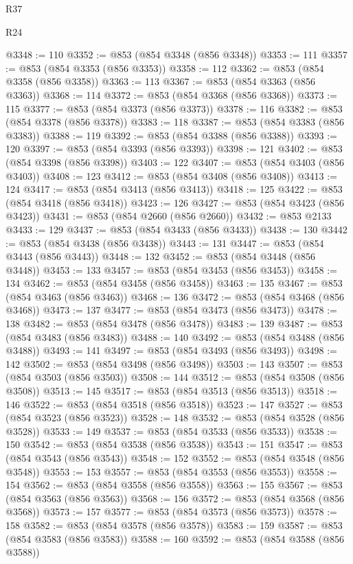 \begin{lexlean}{R37}
\begin{lexlean}{R24}
\begin{coremodule}
{{{{{{{{{{{{{{{{{{{{{{{{{{{{{{{{{{{{{{{{{{{{{{{{{{{{{{{{{{{{{{{{{{{{{{{{{{{{{{{{{{{{{{{{{{{{{{{{{{{{{{{{{{{{{{{{{{{{{{{{{{{{{{{{{{{{{{{{{{{{{{{{{{{{{{{{{{{{{{{{{{{{{{{{{{{{{{{{{{{{{{{{{@3348 := 110
@3352 := @853 (@854 @3348 (@856 @3348))
@3353 := 111
@3357 := @853 (@854 @3353 (@856 @3353))
@3358 := 112
@3362 := @853 (@854 @3358 (@856 @3358))
@3363 := 113
@3367 := @853 (@854 @3363 (@856 @3363))
@3368 := 114
@3372 := @853 (@854 @3368 (@856 @3368))
@3373 := 115
@3377 := @853 (@854 @3373 (@856 @3373))
@3378 := 116
@3382 := @853 (@854 @3378 (@856 @3378))
@3383 := 118
@3387 := @853 (@854 @3383 (@856 @3383))
@3388 := 119
@3392 := @853 (@854 @3388 (@856 @3388))
@3393 := 120
@3397 := @853 (@854 @3393 (@856 @3393))
@3398 := 121
@3402 := @853 (@854 @3398 (@856 @3398))
@3403 := 122
@3407 := @853 (@854 @3403 (@856 @3403))
@3408 := 123
@3412 := @853 (@854 @3408 (@856 @3408))
@3413 := 124
@3417 := @853 (@854 @3413 (@856 @3413))
@3418 := 125
@3422 := @853 (@854 @3418 (@856 @3418))
@3423 := 126
@3427 := @853 (@854 @3423 (@856 @3423))
@3431 := @853 (@854 @2660 (@856 @2660))
@3432 := @853 @2133
@3433 := 129
@3437 := @853 (@854 @3433 (@856 @3433))
@3438 := 130
@3442 := @853 (@854 @3438 (@856 @3438))
@3443 := 131
@3447 := @853 (@854 @3443 (@856 @3443))
@3448 := 132
@3452 := @853 (@854 @3448 (@856 @3448))
@3453 := 133
@3457 := @853 (@854 @3453 (@856 @3453))
@3458 := 134
@3462 := @853 (@854 @3458 (@856 @3458))
@3463 := 135
@3467 := @853 (@854 @3463 (@856 @3463))
@3468 := 136
@3472 := @853 (@854 @3468 (@856 @3468))
@3473 := 137
@3477 := @853 (@854 @3473 (@856 @3473))
@3478 := 138
@3482 := @853 (@854 @3478 (@856 @3478))
@3483 := 139
@3487 := @853 (@854 @3483 (@856 @3483))
@3488 := 140
@3492 := @853 (@854 @3488 (@856 @3488))
@3493 := 141
@3497 := @853 (@854 @3493 (@856 @3493))
@3498 := 142
@3502 := @853 (@854 @3498 (@856 @3498))
@3503 := 143
@3507 := @853 (@854 @3503 (@856 @3503))
@3508 := 144
@3512 := @853 (@854 @3508 (@856 @3508))
@3513 := 145
@3517 := @853 (@854 @3513 (@856 @3513))
@3518 := 146
@3522 := @853 (@854 @3518 (@856 @3518))
@3523 := 147
@3527 := @853 (@854 @3523 (@856 @3523))
@3528 := 148
@3532 := @853 (@854 @3528 (@856 @3528))
@3533 := 149
@3537 := @853 (@854 @3533 (@856 @3533))
@3538 := 150
@3542 := @853 (@854 @3538 (@856 @3538))
@3543 := 151
@3547 := @853 (@854 @3543 (@856 @3543))
@3548 := 152
@3552 := @853 (@854 @3548 (@856 @3548))
@3553 := 153
@3557 := @853 (@854 @3553 (@856 @3553))
@3558 := 154
@3562 := @853 (@854 @3558 (@856 @3558))
@3563 := 155
@3567 := @853 (@854 @3563 (@856 @3563))
@3568 := 156
@3572 := @853 (@854 @3568 (@856 @3568))
@3573 := 157
@3577 := @853 (@854 @3573 (@856 @3573))
@3578 := 158
@3582 := @853 (@854 @3578 (@856 @3578))
@3583 := 159
@3587 := @853 (@854 @3583 (@856 @3583))
@3588 := 160
@3592 := @853 (@854 @3588 (@856 @3588))
}}}}}}}}}}}}}}}}}}}}}}}}}}}}}}}}}}}}}}}}}}}}}}}}}}}}}}}}}}}}}}}}}}}}}}}}}}}}}}}}}}}}}}}}}}}}}}}}}}}}}}}}}}}}}}}}}}}}}}}}}}}}}}}}}}}}}}}}}}}}}}}}}}}}}}}}}}}}}}}}}}}}}}}}}}}}}}}}}}}}}}}}}
\end{coremodule}
\end{lexlean}
\end{lexlean}
